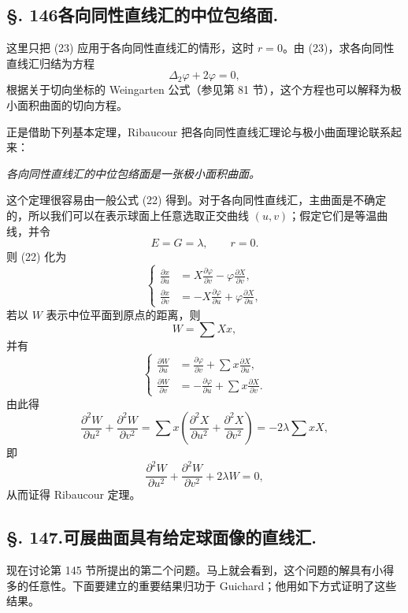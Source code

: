 \subsection*{\S. 146\quad 各向同性直线汇的中位包络面.}

这里只把 (23) 应用于各向同性直线汇的情形，这时 \(r=0\)。由 (23)，求各向同性直线汇归结为方程
\[
 \Delta_2\varphi+2\varphi=0,
\]
根据关于切向坐标的 Weingarten 公式（参见第 81 节），这个方程也可以解释为极小面积曲面的切向方程。

正是借助下列基本定理，Ribaucour 把各向同性直线汇理论与极小曲面理论联系起来：

\emph{各向同性直线汇的中位包络面}\emph{是一张极小面积曲面。}

这个定理很容易由一般公式 (22) 得到。对于各向同性直线汇，主曲面是不确定的，所以我们可以在表示球面上任意选取正交曲线 \((u,v)\)；假定它们是等温曲线，并令
\[
 E=G=\lambda,
 \qquad r=0.
\]
则 (22) 化为
\[
\left\{
\begin{aligned}
\frac{\partial x}{\partial u}&=X\frac{\partial\varphi}{\partial v}-\varphi\frac{\partial X}{\partial v},\\
\frac{\partial x}{\partial v}&=-X\frac{\partial\varphi}{\partial u}+\varphi\frac{\partial X}{\partial u},
\end{aligned}
\right.
\]
若以 \(W\) 表示中位平面到原点的距离，则
\[
 W=\sum Xx,
\]
并有
\[
\left\{
\begin{aligned}
\frac{\partial W}{\partial u}&=\frac{\partial\varphi}{\partial v}+\sum x\frac{\partial X}{\partial u},\\
\frac{\partial W}{\partial v}&=-\frac{\partial\varphi}{\partial u}+\sum x\frac{\partial X}{\partial v}.
\end{aligned}
\right.
\]
由此得
\[
\frac{\partial^2W}{\partial u^2}+\frac{\partial^2W}{\partial v^2}
=\sum x\left(\frac{\partial^2X}{\partial u^2}+\frac{\partial^2X}{\partial v^2}\right)
=-2\lambda\sum xX,
\]
即
\[
 \frac{\partial^2W}{\partial u^2}+\frac{\partial^2W}{\partial v^2}+2\lambda W=0,
\]
从而证得 Ribaucour 定理。

\subsection*{\S. 147.\quad 可展曲面具有给定球面像的直线汇.}

现在讨论第 145 节所提出的第二个问题。马上就会看到，这个问题的解具有小得多的任意性。下面要建立的重要结果归功于 Guichard；他用如下方式证明了这些结果。

